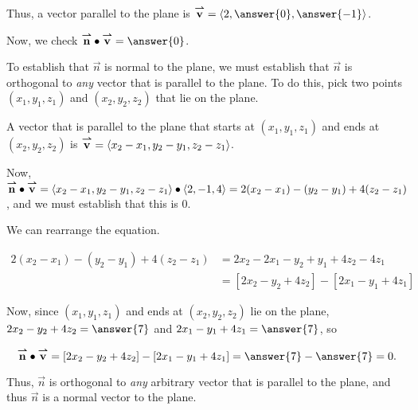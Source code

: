 \documentclass{ximera}
\begin{document}
\begin{exercise}
\begin{exercise}
\begin{exercise}
Thus, a vector parallel to the plane is $\vec{v} = \vector{2,\answer{0},\answer{-1}}$.

Now, we check $\vec{n} \dotp \vec{v} = \answer{0}$.

\begin{exercise}
To establish that $\vec{n}$ is normal to the plane, we must establish that $\vec{n}$ is orthogonal to \emph{any} vector that is parallel to the plane. To do this, pick two points $(x_1,y_1,z_1)$ and $(x_2,y_2,z_2)$ that lie on the plane.

A vector that is parallel to the plane that starts at $(x_1,y_1,z_1)$ and ends at $(x_2,y_2,z_2)$ is ${\overset{\boldsymbol{\rightharpoonup}}{\mathbf{v}}} = \left\langle x_2-x_1,y_2-y_1,z_2-z_1\right\rangle$.

Now, ${\overset{\boldsymbol{\rightharpoonup}}{\mathbf{n}}} \bullet {\overset{\boldsymbol{\rightharpoonup}}{\mathbf{v}}} = \left\langle x_2-x_1,y_2-y_1,z_2-z_1\right\rangle \bullet \left\langle 2,-1,4\right\rangle = 2(x_2-x_1) -(y_2-y_1) +4(z_2-z_1)$, and we must establish that this is $0$.

We can rearrange the equation.

\begin{align*}
2(x_2-x_1) -(y_2-y_1) +4(z_2-z_1) &= 2x_2-2x_1 -y_2+y_1 +4z_2-4z_1 \\
&= \left[2x_2 -y_2+4z_2\right]-\left[2x_1 -y_1 +4z_1\right]
\end{align*}

Now, since $(x_1,y_1,z_1)$ and ends at $(x_2,y_2,z_2)$  lie on the plane, $2x_2 -y_2+4z_2 = \answer{7}$ and $2x_1 -y_1+4z_1 = \answer{7}$, so 

\[
\vec{n} \dotp \vec{v} = \left[2x_2 -y_2+4z_2\right]-\left[2x_1 -y_1 +4z_1\right] = \answer{7} -\answer{7} = 0.
\]

Thus, $\vec{n}$ is orthogonal to \emph{any} arbitrary vector that is parallel to the plane, and thus $\vec{n}$ is a normal vector to the plane.
\end{exercise}
\end{exercise}
\end{exercise}
\end{exercise}
\end{document}
